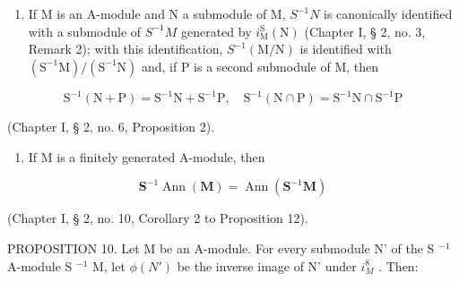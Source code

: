 \begin{enumerate}
\def\labelenumi{(\arabic{enumi})}
\tightlist
\item
  If M is an A-module and N a submodule of M, \(S^{-1}N\) is canonically identified with a submodule of \(S^{-1}M\) generated by \(i_{\mathrm{M}}^{\mathrm{S}}(\mathrm{N})\) (Chapter I, § 2, no. 3, Remark 2); with this identification, \(S^{-1}(\mathrm{M}/\mathrm{N})\) is identified with \((\mathrm{S}^{-1}\mathrm{M})/(\mathrm{S}^{-1}\mathrm{N})\) and, if P is a second submodule of M, then
\end{enumerate}

\[
\mathrm{S} ^ {- 1} (\mathrm{N} + \mathrm{P}) = \mathrm{S} ^ {- 1} \mathrm{N} + \mathrm{S} ^ {- 1} \mathrm{P}, \quad \mathrm{S} ^ {- 1} (\mathrm{N} \cap \mathrm{P}) = \mathrm{S} ^ {- 1} \mathrm{N} \cap \mathrm{S} ^ {- 1} \mathrm{P}
\]

(Chapter I, § 2, no. 6, Proposition 2).

\begin{enumerate}
\def\labelenumi{(\arabic{enumi})}
\setcounter{enumi}{1}
\tightlist
\item
  If M is a finitely generated A-module, then
\end{enumerate}

\[
\mathbf {S} ^ {- 1} \operatorname{Ann} (\mathbf {M}) = \operatorname{Ann} (\mathbf {S} ^ {- 1} \mathbf {M})\tag{9}
\]

(Chapter I, § 2, no. 10, Corollary 2 to Proposition 12).

PROPOSITION 10. Let M be an A-module. For every submodule N' of the S \(^{-1}\) A-module S \(^{-1}\) M, let \(\phi(N')\) be the inverse image of N' under \(i_{M}^{8}\) . Then:

